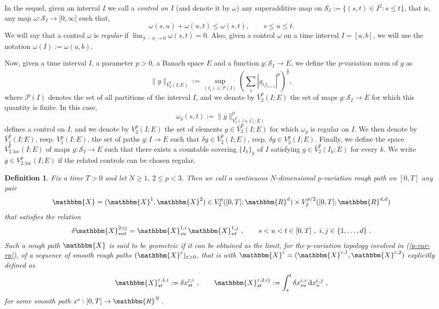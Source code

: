 \documentclass[11pt,reqno,oneside]{amsart}
\numberwithin{equation}{section}
\newcommand{\assign}{:=}
\newcommand{\mathd}{\mathrm{d}}
\newcommand{\tmem}[1]{{\em #1\/}}
\newcommand{\ep}{\varepsilon}
\newtheorem{definition}[theorem]{Definition}
\begin{document}
\smallskip

In the sequel, given an interval $I$ we call a {\tmem{control on $I$}} (and
denote it by $\omega$) any superadditive map on $\mathcal{S}_I \assign \{(s, t) \in
I^2 : s \leqslant t\}$, that is, any map $\omega : \mathcal{S}_I \to [0, \infty [$
such that,
\[ \omega (s, u) + \omega (u, t) \leqslant \omega (s, t), \qquad s \leqslant u
   \leqslant t. \]
We will say that a control $\omega$ is {\tmem{regular}} if $\lim_{|t - s| \to 0} \omega
(s, t) = 0$. Also, given a control $\omega$ on a time interval $I = [a, b]$, we
will use the notation $\omega (I) \assign \omega (a, b)$.

\smallskip

Now, given a time interval $I$, a parameter $p > 0$, a Banach space $E$ and a function $g : \mathcal{S}_I\to E$, we define the $p$-variation norm of $g$ as
\[ \| g \|_{\bar{V}^p_2 (I ; E)} \assign \sup_{(t_i) \in \mathcal{P} (I)}
   \left( \sum_i |g_{t_i t_{i + 1}} |^p \right)^{\frac{1}{p}}, \]
where $\mathcal{P} (I)$ denotes the set of all partitions of the interval $I$, and we denote by $\bar{V}^p_2 (I ; E)$ the set of maps $g:\mathcal{S}_I\to E$ for which this quantity is finite.
In this case,
\[ \omega_g (s, t) \assign \| g \|_{\bar{V}^p_2 ([s, t] ; E)}^p \]
defines a control on $I$, and we denote by $V^p_2 (I ; E)$ the set of elements
$g \in \bar{V}^p_2 (I ; E)$ for which $\omega_g$ is regular on $I$. We then denote
by $\bar{V}^p_1 (I ; E)$, resp. $V^p_1 (I ; E)$, the set of paths $g : I  \to E$ such that $\delta g\in \bar{V}^p_2 (I ; E)$, resp. $\delta g \in V^p_2 (I ; E)$.
Finally, we define the space $\bar{V}^p_{2, \text{loc}} (I ; E)$ of maps $g : \mathcal{S}_I \to E$ such that there exists a countable covering $\{I_k \}_k$ of
$I$ satisfying $g \in \bar{V}^p_2 (I_k ; E)$ for every $k$. We write $g \in V^p_{2, \text{loc}} (I ; E)$ if the related controls can be
chosen regular.

\begin{definition}\label{defi-rough-path}
Fix a time $T>0$ and let $N \geqslant 1$, $2\leqslant p<3$. Then we call a continuous $N$-dimensional $p$-variation rough path on $[0,T]$ any pair 
\begin{equation}\label{p-var-rp}
\mathbbm{X}=(\mathbbm{X}^1,\mathbbm{X}^2) \in V^p_2 ([0,T];\mathbbm{R}^{d}) \times V^{p/2}_2 ([0,T]; \mathbbm{R}^{d,d}) 
\end{equation}
that satisfies the relation 
\begin{equation}\label{chen-rela}
  \delta \mathbbm{X}^{2;ij}_{sut}=\mathbbm{X}^{1,i}_{su} \, \mathbbm{X}^{1,j}_{ut} \ , \qquad s<u<t\in [0,T] \ ,\ i,j\in \{1,\ldots,d\} \ .
\end{equation}
Such a rough path $\mathbbm{X}$ is said to be geometric if it can be obtained as the limit, for the $p$-variation topology involved in (\ref{p-var-rp}), of a sequence of smooth rough paths $(\mathbbm{X}^\ep)_{\ep>0}$, that is with $\mathbbm{X}^\ep=(\mathbbm{X}^{\ep,1},\mathbbm{X}^{\ep,2})$ explicitly defined as
$$\mathbbm{X}^{\ep,1,i}_{st}\assign \delta x^{\ep,i}_{st} \ , \qquad \mathbbm{X}^{\ep,2,ij}_{st}\assign \int_s^t \delta x^{\ep,i}_{su} \, \mathd x^{\ep,j}_u \ ,$$
for some smooth path $x^\ep:[0,T] \to \mathbbm{R}^N$. 
\end{definition}
\end{document}
